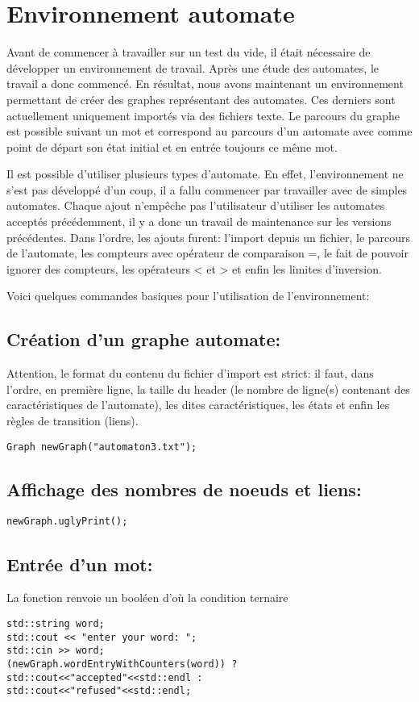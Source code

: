 \section{Environnement automate}
Avant de commencer à travailler sur un test du vide, il était nécessaire de développer un environnement de travail. Après une étude des automates, le travail a donc commencé. En résultat, nous avons maintenant un environnement permettant de créer des graphes représentant des automates. Ces derniers sont actuellement uniquement importés via des fichiers texte. Le parcours du graphe est possible suivant un mot et correspond au parcours d'un automate avec comme point de départ son état initial et en entrée toujours ce même mot.\par
Il est possible d'utiliser plusieurs types d'automate. En effet, l'environnement ne s'est pas développé d'un coup, il a fallu commencer par travailler avec de simples automates. Chaque ajout n'empêche pas l'utilisateur d'utiliser les automates acceptés précédemment, il y a donc un travail de maintenance sur les versions précédentes. Dans l'ordre, les ajouts furent: l'import depuis un fichier, le parcours de l'automate, les compteurs avec opérateur de comparaison =, le fait de pouvoir ignorer des compteurs, les opérateurs < et > et enfin les limites d'inversion.\par
Voici quelques commandes basiques pour l'utilisation de l'environnement:

\subsection{Création d'un graphe automate:}
Attention, le format du contenu du fichier d'import est strict: il faut, dans l'ordre, en première ligne, la taille du header (le nombre de ligne(s) contenant des caractéristiques de l'automate), les dites caractéristiques, les états et enfin les règles de transition (liens).
\begin{verbatim} 
Graph newGraph("automaton3.txt");
\end{verbatim}

\subsection{Affichage des nombres de noeuds et liens:}
\begin{verbatim} 
newGraph.uglyPrint();
\end{verbatim}

\subsection{Entrée d'un mot:}
La fonction renvoie un booléen d'où la condition ternaire
\begin{verbatim} 
std::string word;
std::cout << "enter your word: ";
std::cin >> word;
(newGraph.wordEntryWithCounters(word)) ?
std::cout<<"accepted"<<std::endl : 
std::cout<<"refused"<<std::endl;
\end{verbatim}

